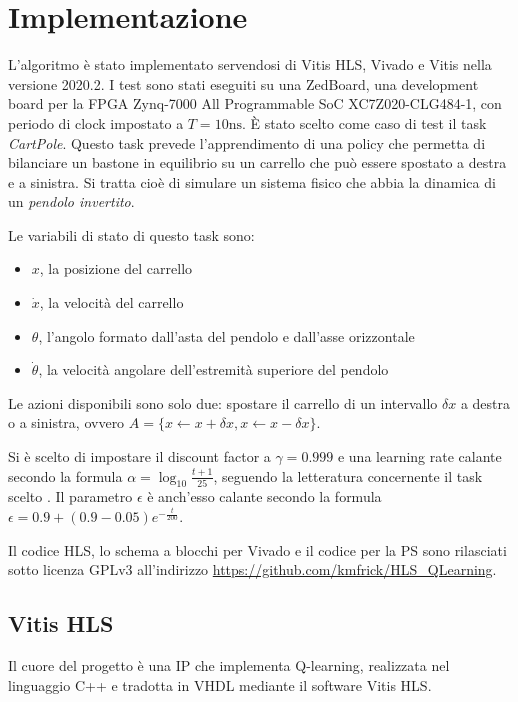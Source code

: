 \documentclass{article}
\begin{document}
\section{Implementazione}
L'algoritmo è stato implementato servendosi di Vitis HLS, Vivado e Vitis nella versione 2020.2. 
I test sono stati eseguiti su una ZedBoard, una development board per la FPGA Zynq-7000 All Programmable SoC XC7Z020-CLG484-1, con periodo di clock impostato a $T = 10 \textrm{ns}$.
È stato scelto come caso di test il task \emph{CartPole}.
Questo task prevede l'apprendimento di una policy che permetta di bilanciare un bastone in equilibrio su un carrello che può essere spostato a destra e a sinistra.
Si tratta cioè di simulare un sistema fisico che abbia la dinamica di un \emph{pendolo invertito}. 

Le variabili di stato di questo task sono:

\begin{itemize}
\item $x$, la posizione del carrello
\item $\dot{x}$, la velocità del carrello
\item $\theta$, l'angolo formato dall'asta del pendolo e dall'asse orizzontale
\item $\dot{\theta}$, la velocità angolare dell'estremità superiore del pendolo
\end{itemize}

Le azioni disponibili sono solo due: spostare il carrello di un intervallo $\delta x$ a destra o a sinistra, ovvero $A = \{x \leftarrow x + \delta x, x \leftarrow x - \delta x\}$. 

Si è scelto di impostare il discount factor a $\gamma = 0.999$ e una learning rate calante secondo la formula $\alpha = \log_{10}\frac{t + 1}{25}$, seguendo la letteratura concernente il task scelto \citep{sutton_reinforcement_2018}.
Il parametro $\epsilon$ è anch'esso calante secondo la formula $\epsilon = 0.9 + (0.9 - 0.05) e^{-\frac{t}{200}}$.

Il codice HLS, lo schema a blocchi per Vivado e il codice per la PS sono rilasciati sotto licenza GPLv3 all'indirizzo \url{https://github.com/kmfrick/HLS_QLearning}.
\subsection{Vitis HLS}
Il cuore del progetto è una IP che implementa Q-learning, realizzata nel linguaggio C++ e tradotta in VHDL mediante il software Vitis HLS. 
\end{document}
